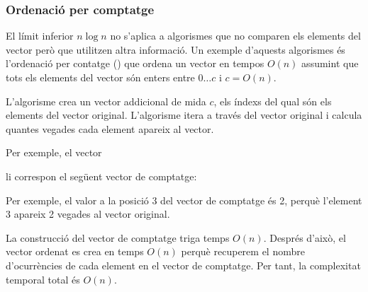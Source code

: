 \subsubsection{Ordenació per comptatge}


El límit inferior $n \log n$ no s'aplica a
algorismes que no comparen els elements del vector
però que utilitzen altra informació.
Un exemple d'aquests algorismes és
l'ordenació per contatge () que ordena
un vector en tempos $O(n)$ assumint que tots els elements del
vector són enters entre $0 \ldots c$ i $c=O(n)$.

L'algorisme crea un vector addicional de mida $c$, els 
índexs del qual són els elements del vector original.
L'algorisme itera a través del vector original
i calcula quantes vegades cada element
apareix al vector.

Per exemple, el vector
\begin{center}
\end{center}
li correspon el seg\"uent vector de comptatge:
\begin{center}
\end{center}

Per exemple, el valor a la posició 3
del vector de comptatge és 2,
perquè l'element 3 apareix 2 vegades
al vector original.

La construcció del vector de comptatge
triga temps $O(n)$. Després d'això, el vector ordenat
es crea en temps $O(n)$ perquè recuperem el nombre
d'ocurrències de cada element en el vector de comptatge.
Per tant, la complexitat temporal total és $O(n)$.


